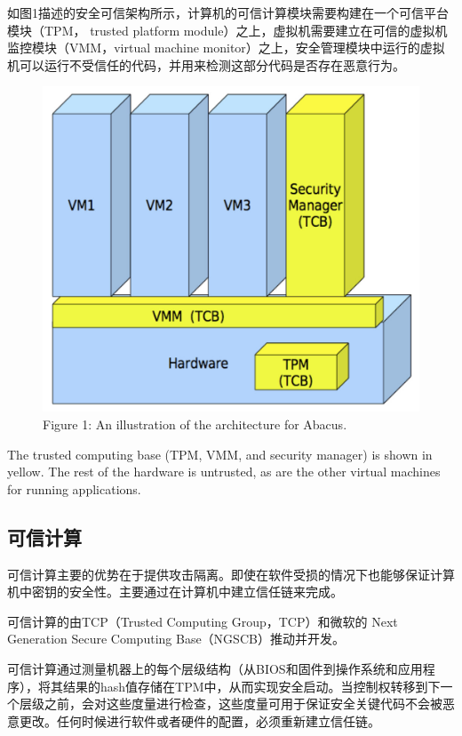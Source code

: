 \documentclass[UTF8]{ctexart}
\begin{document}
    如图1描述的安全可信架构所示，计算机的可信计算模块需要构建在一个可信平台模块（TPM， trusted platform module）之上，虚拟机需要建立在可信的虚拟机监控模块（VMM，virtual machine monitor）之上，安全管理模块中运行的虚拟机可以运行不受信任的代码，并用来检测这部分代码是否存在恶意行为。
    \begin{figure}[ht]
        \centering
        \includegraphics[scale=0.5]{picture/architecture.jpg}
        \caption{Figure 1: An illustration of the architecture for Abacus. }
        \label{fig:architecture}
    \end{figure}
    The trusted computing base (TPM, VMM, and security manager) is shown in yellow. The rest of the hardware is untrusted, as are the other virtual machines for running  applications.
    \subsection{可信计算}
    可信计算主要的优势在于提供攻击隔离。即使在软件受损的情况下也能够保证计算机中密钥的安全性。主要通过在计算机中建立信任链来完成。
    
    可信计算的由TCP（Trusted Computing Group，TCP）和微软的 Next Generation Secure Computing Base（NGSCB）推动并开发。
    
    可信计算通过测量机器上的每个层级结构（从BIOS和固件到操作系统和应用程序），将其结果的hash值存储在TPM中，从而实现安全启动。当控制权转移到下一个层级之前，会对这些度量进行检查，这些度量可用于保证安全关键代码不会被恶意更改。任何时候进行软件或者硬件的配置，必须重新建立信任链。
    
\end{document}
